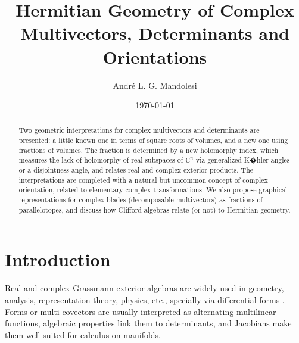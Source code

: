 \documentclass{birkjour}
\theoremstyle{definition}
\def\C			{\mathds{C}}
\begin{document}
\title[Hermitian Geometry of Complex Multivectors and Determinants]{Hermitian Geometry of Complex Multivectors, Determinants and Orientations}



\author{Andr\'e L. G. Mandolesi }
\address{Instituto de Matem\'atica e Estat\'istica \\ Universidade Federal da Bahia \\ Av. Milton Santos s/n \\ 40170-110 Salvador - BA \\ Brazil. \\ ORCID 0000-0002-5329-7034}

\date{\today}

\begin{abstract}
	Two geometric interpretations for complex multivectors and determinants are presented: a little known one in terms of square roots of volumes, and a new one using fractions of volumes. The fraction is determined by a new holomorphy index, which measures the lack of holomorphy of real subspaces of $\C^n$ via generalized K�hler angles or a disjointness angle, and relates real and complex exterior products.	The interpretations are completed with a natural but uncommon concept of complex orientation, related to elementary complex transformations. We also propose graphical representations for complex blades (decomposable multivectors) as fractions of parallelotopes, and discuss how Clifford algebras relate (or not) to Hermitian geometry.
\end{abstract}



\maketitle



\section{Introduction}

Real and complex Grassmann exterior algebras \cite{Bourbaki1989,Greub1978,Shaw1983} are widely used in geometry, analysis, representation theory, physics, etc., specially via differential forms \cite{Frankel2011,Griffiths1994,Huybrechts2004,Rosen2019}. 
Forms or multi-covectors are usually interpreted as alternating multilinear functions, algebraic properties link them to determinants, and Jacobians make them well suited for calculus on manifolds. 
\end{document}
